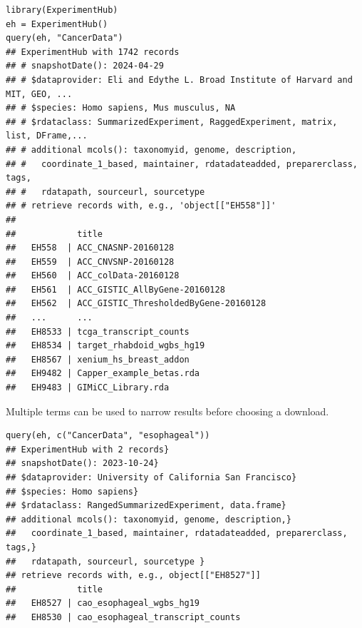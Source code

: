 \documentclass[graybox]{svmult}
\begin{document}
\begin{shaded}
\begin{verbatim}
library(ExperimentHub)
eh = ExperimentHub()
query(eh, "CancerData")
## ExperimentHub with 1742 records
## # snapshotDate(): 2024-04-29
## # $dataprovider: Eli and Edythe L. Broad Institute of Harvard and MIT, GEO, ...
## # $species: Homo sapiens, Mus musculus, NA
## # $rdataclass: SummarizedExperiment, RaggedExperiment, matrix, list, DFrame,...
## # additional mcols(): taxonomyid, genome, description,
## #   coordinate_1_based, maintainer, rdatadateadded, preparerclass, tags,
## #   rdatapath, sourceurl, sourcetype 
## # retrieve records with, e.g., 'object[["EH558"]]' 
## 
##            title                                
##   EH558  | ACC_CNASNP-20160128                  
##   EH559  | ACC_CNVSNP-20160128                  
##   EH560  | ACC_colData-20160128                 
##   EH561  | ACC_GISTIC_AllByGene-20160128        
##   EH562  | ACC_GISTIC_ThresholdedByGene-20160128
##   ...      ...                                  
##   EH8533 | tcga_transcript_counts               
##   EH8534 | target_rhabdoid_wgbs_hg19            
##   EH8567 | xenium_hs_breast_addon               
##   EH9482 | Capper_example_betas.rda             
##   EH9483 | GIMiCC_Library.rda    
\end{verbatim}
\end{shaded}


Multiple terms can be used to narrow results before choosing a download.

\begin{shaded}
\begin{verbatim}
query(eh, c("CancerData", "esophageal"))
## ExperimentHub with 2 records}
## snapshotDate(): 2023-10-24}
## $dataprovider: University of California San Francisco}
## $species: Homo sapiens}
## $rdataclass: RangedSummarizedExperiment, data.frame}
## additional mcols(): taxonomyid, genome, description,}
##   coordinate_1_based, maintainer, rdatadateadded, preparerclass, tags,}
##   rdatapath, sourceurl, sourcetype }
## retrieve records with, e.g., object[["EH8527"]]
##            title                           
##   EH8527 | cao_esophageal_wgbs_hg19        
##   EH8530 | cao_esophageal_transcript_counts
\end{verbatim}
\end{shaded}
\end{document}
